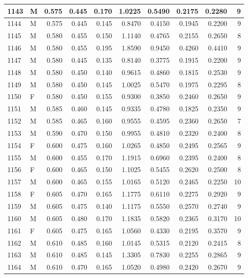 \documentclass[9pt,twocolumn,twoside,]{pnas-new}
\begin{document}
\begin{tabular}{l|l|r|r|r|r|r|r|r|r}
\hline
1143 & M & 0.575 & 0.445 & 0.170 & 1.0225 & 0.5490 & 0.2175 & 0.2280 & 9\\
\hline
1144 & M & 0.575 & 0.445 & 0.145 & 0.8470 & 0.4150 & 0.1945 & 0.2200 & 9\\
\hline
1145 & M & 0.580 & 0.455 & 0.150 & 1.1140 & 0.4765 & 0.2155 & 0.2650 & 8\\
\hline
1146 & M & 0.580 & 0.455 & 0.195 & 1.8590 & 0.9450 & 0.4260 & 0.4410 & 9\\
\hline
1147 & M & 0.580 & 0.445 & 0.135 & 0.8140 & 0.3775 & 0.1915 & 0.2200 & 9\\
\hline
1148 & M & 0.580 & 0.450 & 0.140 & 0.9615 & 0.4860 & 0.1815 & 0.2530 & 9\\
\hline
1149 & M & 0.580 & 0.450 & 0.145 & 1.0025 & 0.5470 & 0.1975 & 0.2295 & 8\\
\hline
1150 & F & 0.580 & 0.450 & 0.155 & 0.9300 & 0.3850 & 0.2460 & 0.2650 & 9\\
\hline
1151 & M & 0.585 & 0.460 & 0.145 & 0.9335 & 0.4780 & 0.1825 & 0.2350 & 9\\
\hline
1152 & M & 0.585 & 0.465 & 0.160 & 0.9555 & 0.4595 & 0.2360 & 0.2650 & 7\\
\hline
1153 & M & 0.590 & 0.470 & 0.150 & 0.9955 & 0.4810 & 0.2320 & 0.2400 & 8\\
\hline
1154 & F & 0.600 & 0.475 & 0.160 & 1.0265 & 0.4850 & 0.2495 & 0.2565 & 9\\
\hline
1155 & M & 0.600 & 0.455 & 0.170 & 1.1915 & 0.6960 & 0.2395 & 0.2400 & 8\\
\hline
1156 & F & 0.600 & 0.465 & 0.150 & 1.1025 & 0.5455 & 0.2620 & 0.2500 & 8\\
\hline
1157 & M & 0.600 & 0.465 & 0.155 & 1.0165 & 0.5120 & 0.2465 & 0.2250 & 10\\
\hline
1158 & F & 0.605 & 0.470 & 0.165 & 1.1775 & 0.6110 & 0.2275 & 0.2920 & 9\\
\hline
1159 & M & 0.605 & 0.475 & 0.140 & 1.1175 & 0.5550 & 0.2570 & 0.2740 & 9\\
\hline
1160 & M & 0.605 & 0.480 & 0.170 & 1.1835 & 0.5820 & 0.2365 & 0.3170 & 10\\
\hline
1161 & F & 0.605 & 0.475 & 0.165 & 1.0560 & 0.4330 & 0.2195 & 0.3570 & 9\\
\hline
1162 & M & 0.610 & 0.485 & 0.160 & 1.0145 & 0.5315 & 0.2120 & 0.2415 & 8\\
\hline
1163 & M & 0.610 & 0.485 & 0.145 & 1.3305 & 0.7830 & 0.2255 & 0.2865 & 9\\
\hline
1164 & M & 0.610 & 0.470 & 0.165 & 1.0520 & 0.4980 & 0.2420 & 0.2670 & 9\\

\end{tabular}
\end{document}
